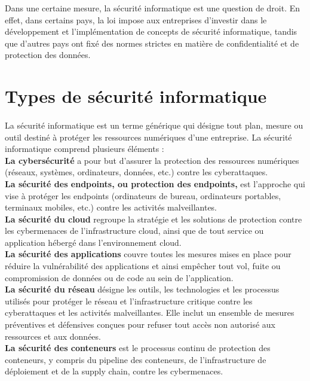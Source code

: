  Dans une certaine mesure, la sécurité informatique est une question de droit. En effet, dans certains pays, la loi impose aux entreprises d’investir dans le développement et l’implémentation de concepts de sécurité informatique, tandis que d’autres pays ont fixé des normes strictes en matière de confidentialité et de protection des données.
 \section{Types de sécurité informatique}
 \paragraph{ }
 La sécurité informatique est un terme générique qui désigne tout plan, mesure ou outil destiné à protéger les ressources numériques d’une entreprise. La sécurité informatique comprend plusieurs éléments :\\
 
 \textbf{La cybersécurité} a pour but d’assurer la protection des ressources numériques (réseaux, systèmes, ordinateurs, données, etc.) contre les cyberattaques.\\
 
 \textbf{La sécurité des endpoints, ou protection des endpoints,} est l’approche qui vise à protéger les endpoints (ordinateurs de bureau, ordinateurs portables, terminaux mobiles, etc.) contre les activités malveillantes.\\
 
 \textbf{La sécurité du cloud} regroupe la stratégie et les solutions de protection contre les cybermenaces de l’infrastructure cloud, ainsi que de tout service ou application hébergé dans l’environnement cloud.\\
 
 \textbf{La sécurité des applications} couvre toutes les mesures mises en place pour réduire la vulnérabilité des applications et ainsi empêcher tout vol, fuite ou compromission de données ou de code au sein de l’application.\\
 
 \textbf{La sécurité du réseau }désigne les outils, les technologies et les processus utilisés pour protéger le réseau et l’infrastructure critique contre les cyberattaques et les activités malveillantes. Elle inclut un ensemble de mesures préventives et défensives conçues pour refuser tout accès non autorisé aux ressources et aux données.\\
 
 \textbf{La sécurité des conteneurs} est le processus continu de protection des conteneurs, y compris du pipeline des conteneurs, de l’infrastructure de déploiement et de la supply chain, contre les cybermenaces.\\
 
